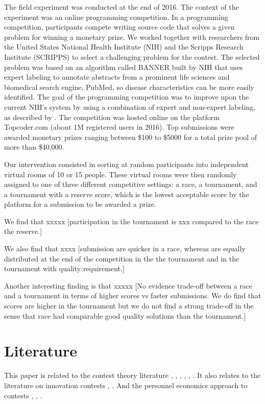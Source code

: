 \documentclass[12pt,]{article}
\begin{document}
The field experiment was conducted at the end of 2016. The context of
the experiment was an online programming competition. In a programming
competition, participants compete writing source code that solves a
given problem for winning a monetary prize. We worked together with
researchers from the United States National Health Institute (NIH) and
the Scripps Research Institute (SCRIPPS) to select a challenging problem
for the contest. The selected problem was based on an algorithm called
BANNER built by NIH \citep{leaman2008banner} that uses expert labeling
to annotate abstracts from a prominent life sciences and biomedical
search engine, PubMed, so disease characteristics can be more easily
identified. The goal of the programming competition was to improve upon
the current NIH's system by using a combination of expert and non-expert
labeling, as described by \citet{good2014microtask}. The competition was
hosted online on the platform Topcoder.com (about 1M registered users in
2016). Top submissions were awarded monetary prizes ranging between
\$100 to \$5000 for a total prize pool of more than \$40,000.

Our intervention consisted in sorting at random participants into
independent virtual rooms of 10 or 15 people. These virtual rooms were
then randomly assigned to one of three different competitive settings: a
race, a tournament, and a tournament with a reserve score, which is the
lowest acceptable score by the platform for a submission to be awarded a
prize.

We find that xxxxx {[}participation in the tournament is xxx compared to
the race the reserve.{]}

We also find that xxxx {[}submission are quicker in a race, whereas are
equally distributed at the end of the competition in the the tournament
and in the tournament with quality requirement.{]}

Another interesting finding is that xxxxx {[}No evidence trade-off
between a race and a tournament in terms of higher scores vs faster
submissions. We do find that scores are higher in the tournament but we
do not find a strong trade-off in the sense that race had comparable
good quality solutions than the tournament.{]}

\section{Literature}\label{literature}

This paper is related to the contest theory literature
\citet{dixit1987strategic} \citet{baye2003strategic},
\citet{parreiras2010contests}, \citet{moldovanu2001optimal},
\citet{moldovanu2006contest}, \citet{siegel2009all},
\citet{siegel2014contests}. It also relates to the literature on
innovation contests \citet{taylor1995digging}, \citet{che2003optimal}.
And the personnel economics approach to contests \citet{lazear1981rank},
\citet{green1983comparison}, \citet{mary1984economic}.
\end{document}
